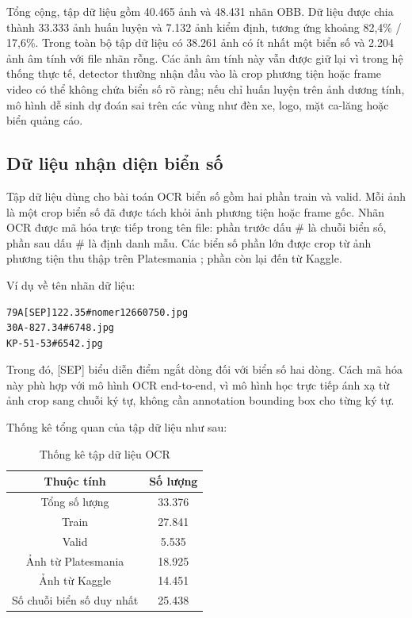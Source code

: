 \documentclass[../DoAn.tex]{subfiles}
\begin{document}
Tổng cộng, tập dữ liệu gồm 40.465 ảnh và 48.431 nhãn OBB. Dữ liệu được chia thành 33.333 ảnh huấn luyện và 7.132 ảnh kiểm định, tương ứng khoảng 82,4\% / 17,6\%. Trong toàn bộ tập dữ liệu có 38.261 ảnh có ít nhất một biển số và 2.204 ảnh âm tính với file nhãn rỗng. Các ảnh âm tính này vẫn được giữ lại vì trong hệ thống thực tế, detector thường nhận đầu vào là crop phương tiện hoặc frame video có thể không chứa biển số rõ ràng; nếu chỉ huấn luyện trên ảnh dương tính, mô hình dễ sinh dự đoán sai trên các vùng như đèn xe, logo, mặt ca-lăng hoặc biển quảng cáo.

\subsection{Dữ liệu nhận diện biển số}
\label{subsection:4.data.2}
Tập dữ liệu dùng cho bài toán OCR biển số gồm hai phần train và valid. Mỗi ảnh là một crop biển số đã được tách khỏi ảnh phương tiện hoặc frame gốc. Nhãn OCR được mã hóa trực tiếp trong tên file: phần trước dấu \# là chuỗi biển số, phần sau dấu \# là định danh mẫu. Các biển số phần lớn được crop từ ảnh phương tiện thu thập trên Platesmania \cite{platesmania}; phần còn lại đến từ Kaggle.

Ví dụ về tên nhãn dữ liệu:

\begin{verbatim}
79A[SEP]122.35#nomer12660750.jpg
30A-827.34#6748.jpg
KP-51-53#6542.jpg
\end{verbatim}

Trong đó, [SEP] biểu diễn điểm ngắt dòng đối với biển số hai dòng. Cách mã hóa này phù hợp với mô hình OCR end-to-end, vì mô hình học trực tiếp ánh xạ từ ảnh crop sang chuỗi ký tự, không cần annotation bounding box cho từng ký tự.

Thống kê tổng quan của tập dữ liệu như sau:
\begin{table}[htbp]
\centering
\caption{Thống kê tập dữ liệu OCR}

\begin{tabular}{|c|c|}
\hline
Thuộc tính & Số lượng \\
\hline
Tổng số lượng & 33.376 \\
Train & 27.841 \\
Valid & 5.535 \\
Ảnh từ Platesmania \cite{platesmania} & 18.925 \\
Ảnh từ Kaggle & 14.451 \\
Số chuỗi biển số duy nhất & 25.438 \\
\hline
\end{tabular}
\end{table}
\end{document}
